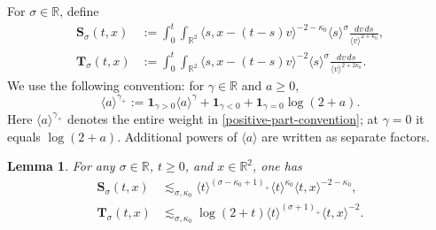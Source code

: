 \documentclass[reqno,11pt]{amsart}
\numberwithin{equation}{section}
\newtheorem{lemma}[theorem]{Lemma}
\begin{document}
	For $\sigma\in\mathbb R$, define
	\begin{align}
		\mathbf S_\sigma(t,x)
		&:=
		\int_0^t\int_{\mathbb R^2}
		\langle s,x-(t-s)v\rangle^{-2-\kappa_0}
		\langle s\rangle^\sigma
		\frac{dv\,ds}{\langle v\rangle^{2+\kappa_0}},
		\label{S-sigma-def}
		\\
		\mathbf T_\sigma(t,x)
		&:=
		\int_0^t\int_{\mathbb R^2}
		\langle s,x-(t-s)v\rangle^{-2}
		\langle s\rangle^\sigma
		\frac{dv\,ds}{\langle v\rangle^{2+2\kappa_0}}.
		\label{T-sigma-def}
	\end{align}
		We use the following convention: for $\gamma\in\mathbb R$ and $a\ge0$,
	\begin{equation}\label{positive-part-convention}
		\langle a\rangle^{\gamma_+}
		:=
		\mathbf 1_{\gamma>0}\langle a\rangle^\gamma
		+
		\mathbf 1_{\gamma<0}
		+
		\mathbf 1_{\gamma=0}\log(2+a).
	\end{equation}
	Here $\langle a\rangle^{\gamma_+}$ denotes the entire weight in
	\eqref{positive-part-convention}; at $\gamma=0$ it equals $\log(2+a)$.
	Additional powers of $\langle a\rangle$ are written as separate factors.
	
	\begin{lemma}\label{Le3}
		For any $\sigma\in\mathbb R$, $t\ge0$, and $x\in\mathbb R^2$, one has
		\begin{align}
			\mathbf S_\sigma(t,x)
			&\mathrel{\lesssim_{\sigma,\kappa_0}}
			\langle t\rangle^{(\sigma-\kappa_0+1)_+}
			\langle t\rangle^{\kappa_0}
			\langle t,x\rangle^{-2-\kappa_0},
			\label{z143a}
			\\
			\mathbf T_\sigma(t,x)
			&\mathrel{\lesssim_{\sigma,\kappa_0}}
			\log(2+t)
			\langle t\rangle^{(\sigma+1)_+}
			\langle t,x\rangle^{-2}.
			\label{z143b}
		\end{align}
	\end{lemma}
	
\end{document}
